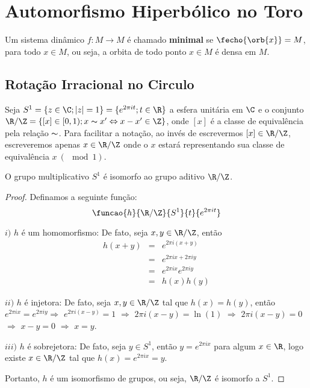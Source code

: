 

\chapter{Automorfismo Hiperbólico no Toro}

\begin{definicao} Um sistema dinâmico $f:M\to M$ é chamado \textbf{minimal} se $\fecho{\orb{x}}=M$, para todo $x\in M$, ou seja, a orbita de todo ponto $x \in M$ é densa em $M$.

\end{definicao}

\section{Rotação Irracional no Circulo}

Seja $S^1=\{z\in\C;|z|=1\}=\{e^{2\pi it};t\in\R\}$ a esfera unitária em $\C$ e o conjunto $\R/\Z=\{[x]\in [0,1);x\thicksim x'\Leftrightarrow x-x'\in\Z\}$, onde $[x]$ é a classe de equivalência pela relação $\thicksim$. Para facilitar a notação, ao invés de escrevermos $[x]\in\R/\Z$, escreveremos apenas $x\in\R/\Z$ onde o $x$ estará representando sua classe de equivalência $x\ (\mod 1)$.

\begin{proposicao} O grupo multiplicativo $S^1$ é isomorfo ao grupo aditivo $\R/\Z$.

\end{proposicao}

\begin{proof} Definamos a seguinte função:
\begin{equation*}
\funcao{h}{\R/\Z}{S^1}{t}{e^{2\pi it}}
\end{equation*}

$i)$ $h$ é um homomorfismo: De fato, seja $x,y\in \R/\Z$, então
\begin{eqnarray*}
h(x+y) & = & e^{2\pi i (x+y)}\\
 & = & e^{2\pi ix + 2\pi iy}\\
 & = & e^{2\pi ix}e^{2\pi iy}\\
 & = & h(x)h(y)
\end{eqnarray*}

$ii)$ $h$ é injetora: De fato, seja $x,y\in \R/\Z$ tal que $h(x)=h(y)$, então $e^{2\pi ix}=e^{2\pi iy}$\newline $\Rightarrow$ $e^{2\pi i(x-y)}=1$ $\Rightarrow$ $2\pi i(x-y)=\ln(1)$ $\Rightarrow$ $2\pi i(x-y)=0$ $\Rightarrow$ $x-y=0$ $\Rightarrow$ $x=y$.

$iii)$ $h$ é sobrejetora: De fato, seja $y\in S^1$, então $y=e^{2\pi ix}$ para algum $x\in\R$, logo existe $x\in\R/\Z$ tal que $h(x)=e^{2\pi ix}=y$.

Portanto, $h$ é um isomorfismo de grupos, ou seja, $\R/\Z$ é isomorfo a $S^1$. 
\end{proof}

